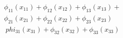 \documentclass[preview]{standalone}
\begin{document}
\begin{align*}
\phi_{11}( x_{11}) + \phi_{12} (x_{12})+ \phi_{13} (x_{13})+\\ \phi_{21} (x_{21}) + \phi_{22} (x_{22})+\phi_{23} (x_{23}) \\\ phi_{31} (x_{31}) + \phi_{32} (x_{32})+\phi_{33} (x_{33})
\end{align*}
\end{document}
